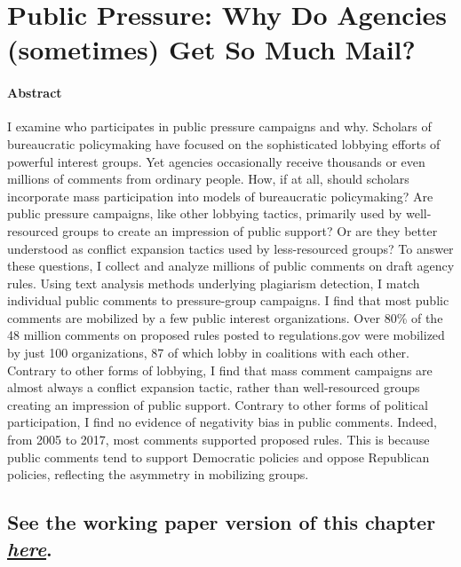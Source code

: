 \documentclass[
]{book}
\begin{document}
\hypertarget{public-pressure-why-do-agencies-sometimes-get-so-much-mail}{%
\chapter{Public Pressure: Why Do Agencies (sometimes) Get So Much Mail?}\label{public-pressure-why-do-agencies-sometimes-get-so-much-mail}}

\hypertarget{abstract-1}{%
\subsubsection*{Abstract}\label{abstract-1}}

I examine who participates in public pressure campaigns and why. Scholars of bureaucratic policymaking have focused on the sophisticated lobbying efforts of powerful interest groups. Yet agencies occasionally receive thousands or even millions of comments from ordinary people. How, if at all, should scholars incorporate mass participation into models of bureaucratic policymaking? Are public pressure campaigns, like other lobbying tactics, primarily used by well-resourced groups to create an impression of public support? Or are they better understood as conflict expansion tactics used by less-resourced groups? To answer these questions, I collect and analyze millions of public comments on draft agency rules. Using text analysis methods underlying plagiarism detection, I match individual public comments to pressure-group campaigns. I find that most public comments are mobilized by a few public interest organizations. Over 80\% of the 48 million comments on proposed rules posted to regulations.gov were mobilized by just 100 organizations, 87 of which lobby in coalitions with each other. Contrary to other forms of lobbying, I find that mass comment campaigns are almost always a conflict expansion tactic, rather than well-resourced groups creating an impression of public support. Contrary to other forms of political participation, I find no evidence of negativity bias in public comments. Indeed, from 2005 to 2017, most comments supported proposed rules. This is because public comments tend to support Democratic policies and oppose Republican policies, reflecting the asymmetry in mobilizing groups.

\hypertarget{see-the-working-paper-version-of-this-chapter-here.-1}{%
\section{\texorpdfstring{See the working paper version of this chapter \href{https://judgelord.github.io/research/whymail/}{\emph{here}}.}{See the working paper version of this chapter here.}}\label{see-the-working-paper-version-of-this-chapter-here.-1}}
\end{document}
